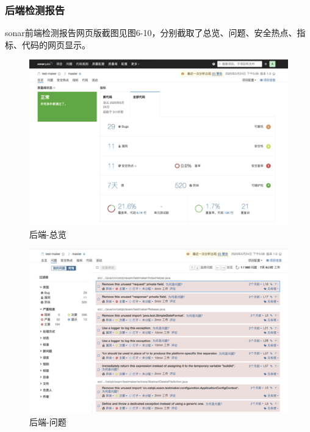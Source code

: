 \documentclass[hyperref, a4paper]{ctexart}
\begin{document}
\hypertarget{ux540eux7aefux68c0ux6d4bux62a5ux544a}{%
\subsubsection{后端检测报告}\label{ux540eux7aefux68c0ux6d4bux62a5ux544a}}

sonar前端检测报告网页版截图见图6-10，分别截取了总览、问题、安全热点、指标、代码的网页显示。

\begin{figure}
\centering
\includegraphics{screenshots/lab7-pic/back-1.png}
\caption{后端-总览}
\end{figure}

\begin{figure}
\centering
\includegraphics{screenshots/lab7-pic/back-2.png}
\caption{后端-问题}
\end{figure}
\end{document}
